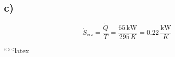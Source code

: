 

\subsection*{c)}

\[
\dot{S}_{\text{erz}} = \frac{\dot{Q}}{T} = \frac{65 \, \text{kW}}{295 \, K} = 0.22 \, \frac{\text{kW}}{K}
\]

``````latex